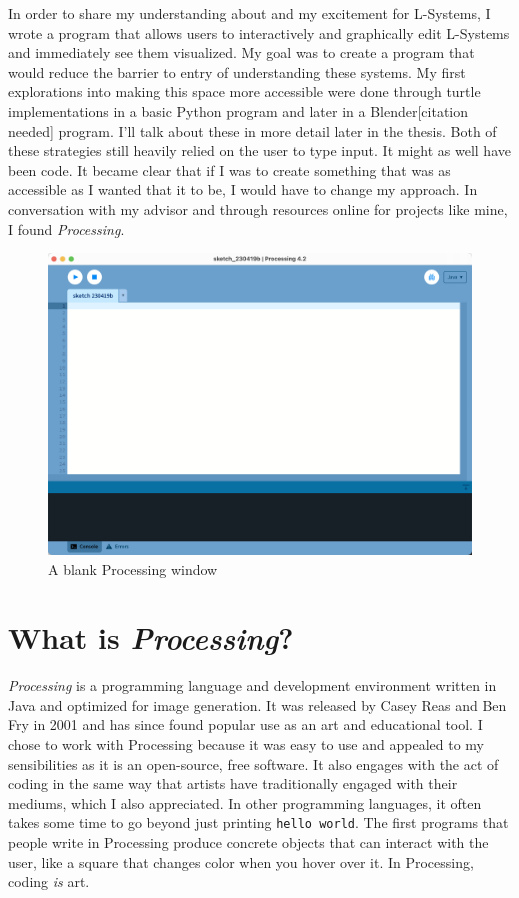 \documentclass[12pt,twoside]{reedthesis}
\newcommand{\code}[1]{\texttt{#1}}
\begin{document}
	In order to share my understanding about and my excitement for L-Systems, I wrote a program that allows users to interactively and graphically edit L-Systems and immediately see them visualized. My goal was to create a program that would reduce the barrier to entry of understanding these systems. My first explorations into making this space more accessible were done through turtle implementations in a basic Python program and later in a Blender[citation needed] program. I'll talk about these in more detail later in the thesis. Both of these strategies still heavily relied on the user to type input. It might as well have been code. It became clear that if I was to create something that was as accessible as I wanted that it to be, I would have to change my approach. In conversation with my advisor and through resources online for projects like mine, I found \textit{Processing}.
	
		
	\begin{figure}[h!]
	\centering
	\includegraphics[scale=0.3]{Images/ProcessingWindow}
	\caption{A blank Processing window}
	\label {ProcessingWindow}
	\end{figure}
	
\section{What is \textit{Processing}?}



	\textit{Processing} is a programming language and development environment written in Java and optimized for image generation. It was released by Casey Reas and Ben Fry in 2001 and has since found popular use as an art and educational tool. I chose to work with Processing because it was easy to use and appealed to my sensibilities as it is an open-source, free software. It also engages with the act of coding in the same way that artists have traditionally engaged with their mediums, which I also appreciated. In other programming languages, it often takes some time to go beyond just printing \code{hello world}. The first programs that people write in Processing produce concrete objects that can interact with the user, like a square that changes color when you hover over it. In Processing, coding \textit{is} art.
	
\end{document}
